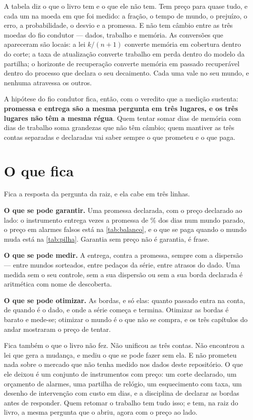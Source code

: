 A tabela diz o que o livro tem e o que ele não tem. Tem preço para quase tudo, e cada um na moeda
em que foi medido: a fração, o tempo de mundo, o prejuízo, o erro, a probabilidade, o desvio e a
promessa. E não tem câmbio entre as três moedas do fio condutor --- dados, trabalho e memória. As
conversões que apareceram são locais: a lei $k/(n+1)$ converte memória em cobertura dentro do corte;
a taxa de atualização converte trabalho em perda dentro do modelo da partilha; o horizonte de
recuperação converte memória em passado recuperável dentro do processo que declara o seu decaimento.
Cada uma vale no seu mundo, e nenhuma atravessa os outros.

A hipótese do fio condutor fica, então, com o veredito que a medição sustenta: \textbf{promessa e entrega
são a mesma pergunta em três lugares, e os três lugares não têm a mesma régua}. Quem tentar somar
dias de memória com dias de trabalho soma grandezas que não têm câmbio; quem mantiver as três
contas separadas e declaradas vai saber sempre o que prometeu e o que paga.

\section{O que fica}

Fica a resposta da pergunta da raiz, e ela cabe em três linhas.

\textbf{O que se pode garantir.} Uma promessa declarada, com o preço declarado ao lado: o instrumento
entrega \numFechoParadoLongaSemAtraso{} vezes a promessa de \numPromessaPct{}\% dos dias num mundo parado, o preço em alarmes falsos está na
\cref{tab:balanco}, e o que se paga quando o mundo muda está na \cref{tab:pilha}. Garantia sem preço
não é garantia, é frase.

\textbf{O que se pode medir.} A entrega, contra a promessa, sempre com a dispersão --- entre mundos
sorteados, entre pedaços da série, entre atrasos do dado. Uma medida sem o seu controle, sem a sua
dispersão ou sem a sua borda declarada é aritmética com nome de descoberta.

\textbf{O que se pode otimizar.} As bordas, e só elas: quanto passado entra na conta, de quando é o dado,
e onde a série começa e termina. Otimizar as bordas é barato e mede-se; otimizar o mundo é o que não
se compra, e os três capítulos do andar mostraram o preço de tentar.

Fica também o que o livro não fez. Não unificou as três contas. Não encontrou a lei que gera a
mudança, e mediu o que se pode fazer sem ela. E não prometeu nada sobre o mercado que não tenha
medido nos dados deste repositório. O que ele deixou é um conjunto de instrumentos com
preço: um corte declarado, um orçamento de alarmes, uma partilha de relógio, um esquecimento com
taxa, um desenho de intervenção com custo em dias, e a disciplina de declarar as bordas antes de
responder. Quem retomar o trabalho tem tudo isso; e tem, na raiz do livro, a mesma pergunta que o
abriu, agora com o preço ao lado.
